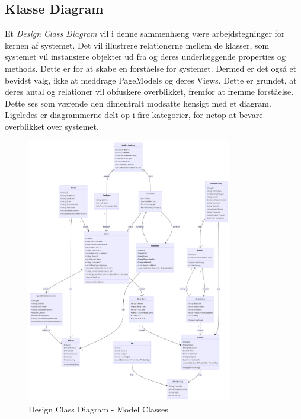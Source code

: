 \subsection{Klasse Diagram}
Et \emph{Design Class Diagram} vil i denne sammenhæng være arbejdstegninger for kernen af systemet. Det vil illustrere relationerne mellem de klasser, som systemet vil instansiere objekter ud fra og deres underlæggende properties og methods. 
Dette er for at skabe en forståelse for systemet. Dermed er det også et bevidst valg, ikke at meddrage PageModels og deres Views. Dette er grundet, at deres antal og relationer vil obfuskere overblikket, fremfor at fremme forståelse. 
Dette ses som værende den dimentralt modsatte hensigt med et diagram. Ligeledes er diagrammerne delt op i fire kategorier, for netop at bevare overblikket over systemet.
\begin{figure}
    \centering
    \includegraphics[width=0.8\textwidth]{figures/diagrams/dcd-modelclasses.png}
    \caption{Design Class Diagram - Model Classes}
    \label{fig:class-diagram-models}
\end{figure}


